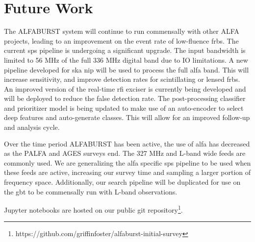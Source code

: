 \documentclass[a4paper,fleqn,usenatbib]{mnras}
\begin{document}

\section{Future Work}
\label{sec:future_work}

The ALFABURST system will continue to run commensally with other ALFA projects,
leading to an improvement on the event rate of low-fluence \glspl{frb}.  The
current \gls{sps} pipeline is undergoing a significant upgrade. The input
bandwidth is limited to 56 MHz of the full 336 MHz digital band due to IO
limitations. A new pipeline developed for \gls{ska} \gls{nip} will be used to
process the full \gls{alfa} band.  This will increase sensitivity, and improve
detection rates for scintillating or lensed \glspl{frb}.  An improved version of
the real-time \gls{rfi} exciser is currently being developed and will be
deployed to reduce the false detection rate. The post-processing classifier and
prioritizer model is being updated to make use of an auto-encoder to select deep
features and auto-generate classes. This will allow for an improved follow-up
and analysis cycle.

Over the time period ALFABURST has been active, the use of \gls{alfa} has
decreased as the PALFA and AGES surveys end. The 327 MHz and L-band wide feeds
are commonly used. We are generalizing the \gls{alfa} specific \gls{sps}
pipeline to be used when these feeds are active, increasing our survey time and
sampling a larger portion of frequency space. Additionally, our search pipeline
will be duplicated for use on the \gls{gbt} to be commensally run with L-band
observations. 

Jupyter notebooks are hosted on our public git
repository\footnote{https://github.com/griffinfoster/alfaburst-initial-survey}.


 

\bsp	%
\label{lastpage}
\end{document}
